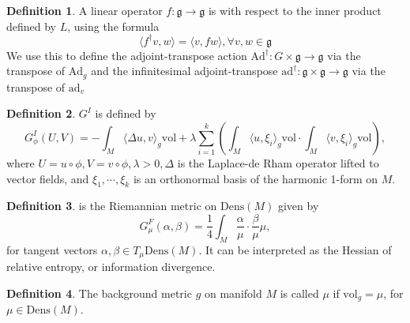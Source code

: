 \documentclass[a4paper]{article}
\theoremstyle{definition}
\newtheorem{definition}{Definition}
\theoremstyle{plain}
\begin{document}
\begin{definition}
A linear operator $f:\mathfrak{g}\rightarrow\mathfrak{g}$ is  with respect to the inner product defined by $L$, using the formula
\begin{equation*}
    \langle f^\dagger v,w\rangle=\langle v,fw\rangle, \forall v,w\in\mathfrak{g}
\end{equation*}
We use this to define the adjoint-transpose action $\mathrm{Ad}^\dagger:G\times\mathfrak{g}\rightarrow\mathfrak{g}$ via the transpose of $\mathrm{Ad}_g$ and the infinitesimal adjoint-transpose $\mathrm{ad}^\dagger:\mathfrak{g}\times\mathfrak{g}\rightarrow\mathfrak{g}$ via the transpose of $\mathrm{ad}_v$
\end{definition}

\begin{definition}
 $G^I$ is defined by
\begin{equation*}
    G^I_\phi(U,V)=-\int_M\langle\Delta u,v\rangle_g \mathrm{vol}+\lambda\sum^k_{i=1}\left(\int_M\langle u,\xi_i\rangle_g \mathrm{vol}\cdot\int_M\langle v,\xi_i\rangle_g \mathrm{vol}\right),
\end{equation*}
where $U=u\circ\phi, V=v\circ\phi, \lambda>0, \Delta$ is the Laplace-de Rham operator lifted to vector fields, and $\xi_1,\cdots,\xi_k$ is an orthonormal basis of the harmonic 1-form on $M$.
\end{definition}

\begin{definition}
 is the Riemannian metric on $\mathrm{Dens}(M)$ given by
\begin{equation*}
    G^F_\mu(\alpha,\beta)=\frac{1}{4}\int_M\frac{\alpha}{\mu}\cdot\frac{\beta}{\mu}\mu,
\end{equation*}
for tangent vectors $\alpha,\beta\in T_\mu\mathrm{Dens}(M)$. It can be interpreted as the Hessian of relative entropy, or information divergence.
\end{definition}

\begin{definition}
The background metric $g$ on manifold $M$ is called  $\mu$ if $\mathrm{vol}_g=\mu$, for $\mu\in\mathrm{Dens}(M)$.
\end{definition}
\end{document}
